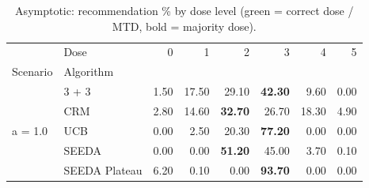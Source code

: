\begin{table}[H]
\centering
\caption{Asymptotic: recommendation \% by dose level (green = correct dose / MTD, bold = majority dose).}
\label{tab:asym_rec_by_dose}
\begin{tabular}{llrrrrrr}
\toprule
 & Dose & 0 & 1 & 2 & 3 & 4 & 5 \\
Scenario & Algorithm &  &  &  &  &  &  \\
\midrule
\multirow[c]{5}{*}{a = 1.0} & 3 + 3 & 1.50 & 17.50 & {\cellcolor[HTML]{C8E6C9}} 29.10 & \bfseries 42.30 & 9.60 & 0.00 \\
 & CRM & 2.80 & 14.60 & {\cellcolor[HTML]{C8E6C9}} \bfseries 32.70 & 26.70 & 18.30 & 4.90 \\
 & UCB & 0.00 & 2.50 & {\cellcolor[HTML]{C8E6C9}} 20.30 & \bfseries 77.20 & 0.00 & 0.00 \\
 & SEEDA & 0.00 & 0.00 & {\cellcolor[HTML]{C8E6C9}} \bfseries 51.20 & 45.00 & 3.70 & 0.10 \\
 & SEEDA Plateau & 6.20 & 0.10 & {\cellcolor[HTML]{C8E6C9}} 0.00 & \bfseries 93.70 & 0.00 & 0.00 \\
\bottomrule
\end{tabular}
\end{table}
